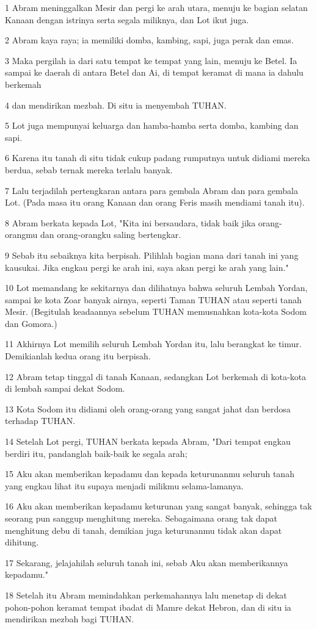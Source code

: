 \par 1 Abram meninggalkan Mesir dan pergi ke arah utara, menuju ke bagian selatan Kanaan dengan istrinya serta segala miliknya, dan Lot ikut juga.
\par 2 Abram kaya raya; ia memiliki domba, kambing, sapi, juga perak dan emas.
\par 3 Maka pergilah ia dari satu tempat ke tempat yang lain, menuju ke Betel. Ia sampai ke daerah di antara Betel dan Ai, di tempat keramat di mana ia dahulu berkemah
\par 4 dan mendirikan mezbah. Di situ ia menyembah TUHAN.
\par 5 Lot juga mempunyai keluarga dan hamba-hamba serta domba, kambing dan sapi.
\par 6 Karena itu tanah di situ tidak cukup padang rumputnya untuk didiami mereka berdua, sebab ternak mereka terlalu banyak.
\par 7 Lalu terjadilah pertengkaran antara para gembala Abram dan para gembala Lot. (Pada masa itu orang Kanaan dan orang Feris masih mendiami tanah itu).
\par 8 Abram berkata kepada Lot, "Kita ini bersaudara, tidak baik jika orang-orangmu dan orang-orangku saling bertengkar.
\par 9 Sebab itu sebaiknya kita berpisah. Pilihlah bagian mana dari tanah ini yang kausukai. Jika engkau pergi ke arah ini, saya akan pergi ke arah yang lain."
\par 10 Lot memandang ke sekitarnya dan dilihatnya bahwa seluruh Lembah Yordan, sampai ke kota Zoar banyak airnya, seperti Taman TUHAN atau seperti tanah Mesir. (Begitulah keadaannya sebelum TUHAN memusnahkan kota-kota Sodom dan Gomora.)
\par 11 Akhirnya Lot memilih seluruh Lembah Yordan itu, lalu berangkat ke timur. Demikianlah kedua orang itu berpisah.
\par 12 Abram tetap tinggal di tanah Kanaan, sedangkan Lot berkemah di kota-kota di lembah sampai dekat Sodom.
\par 13 Kota Sodom itu didiami oleh orang-orang yang sangat jahat dan berdosa terhadap TUHAN.
\par 14 Setelah Lot pergi, TUHAN berkata kepada Abram, "Dari tempat engkau berdiri itu, pandanglah baik-baik ke segala arah;
\par 15 Aku akan memberikan kepadamu dan kepada keturunanmu seluruh tanah yang engkau lihat itu supaya menjadi milikmu selama-lamanya.
\par 16 Aku akan memberikan kepadamu keturunan yang sangat banyak, sehingga tak seorang pun sanggup menghitung mereka. Sebagaimana orang tak dapat menghitung debu di tanah, demikian juga keturunanmu tidak akan dapat dihitung.
\par 17 Sekarang, jelajahilah seluruh tanah ini, sebab Aku akan memberikannya kepadamu."
\par 18 Setelah itu Abram memindahkan perkemahannya lalu menetap di dekat pohon-pohon keramat tempat ibadat di Mamre dekat Hebron, dan di situ ia mendirikan mezbah bagi TUHAN.

